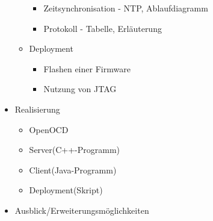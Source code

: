 \begin{itemize}
\begin{itemize}
\begin{itemize}
  	  \item Zeitsynchronisation - NTP, Ablaufdiagramm
      \item Protokoll - Tabelle, Erläuterung
    \end{itemize}
    \item Deployment
    \begin{itemize}
      \item Flashen einer Firmware
      \item Nutzung von JTAG
    \end{itemize}
  \end{itemize}
  \item Realisierung
  \begin{itemize}
    \item OpenOCD
    \item Server(C++-Programm)
    \item Client(Java-Programm)
    \item Deployment(Skript)
  \end{itemize}
  \item Ausblick/Erweiterungsmöglichkeiten
\end{itemize}
\setcounter{page}{0}